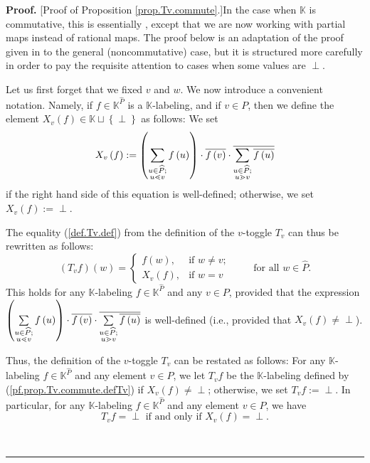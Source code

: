 \documentclass[numbers=enddot,12pt,final,onecolumn,notitlepage]{scrartcl}%
\theoremstyle{definition}
\newenvironment{verlong}{}{}
\newcommand{\undf}{\operatorname*{\bot}}
\newenvironment{proof}[1][Proof]{\noindent\textbf{#1.} }{\ \rule{0.5em}{0.5em}}
\let\sumnonlimits\sum
\renewcommand{\sum}{\sumnonlimits\limits}
\begin{document}
\begin{verlong}


\begin{proof}
[Proof of Proposition \ref{prop.Tv.commute}.]In the case when $\mathbb{K}$ is
commutative, this is essentially \cite[Proposition 2.10]{bir-row-arxiv},
except that we are now working with partial maps instead of rational maps. The
proof below is an adaptation of the proof given in \cite{bir-row-arxiv} to the
general (noncommutative) case, but it is structured more carefully in order to
pay the requisite attention to cases when some values are $\undf$.

Let us first forget that we fixed $v$ and $w$. We now introduce a convenient
notation. Namely, if $f\in\mathbb{K}^{\widehat{P}}$ is a $\mathbb{K}%
$-labeling, and if $v\in P$, then we define the element $X_{v}\left(
f\right)  \in\mathbb{K}\sqcup\left\{  \undf\right\}  $ as follows: We set%
\[
X_{v}\left(  f\right)  :=\left(  \sum\limits_{\substack{u\in\widehat{P}%
;\\u\lessdot v}}f\left(  u\right)  \right)  \cdot\overline{f\left(  v\right)
}\cdot\overline{\sum\limits_{\substack{u\in\widehat{P};\\u\gtrdot v}%
}\overline{f\left(  u\right)  }}%
\]
if the right hand side of this equation is well-defined; otherwise, we set
$X_{v}\left(  f\right)  :=\undf$.

The equality (\ref{def.Tv.def}) from the definition of the $v$-toggle $T_{v}$
can thus be rewritten as follows:%
\begin{equation}
\left(  T_{v}f\right)  \left(  w\right)  =%
\begin{cases}
f\left(  w\right)  , & \text{if }w\neq v;\\
X_{v}\left(  f\right)  , & \text{if }w=v
\end{cases}
\ \ \ \ \ \ \ \ \ \ \text{for all }w\in\widehat{P}.
\label{pf.prop.Tv.commute.defTv}%
\end{equation}
This holds for any $\mathbb{K}$-labeling $f\in\mathbb{K}^{\widehat{P}}$ and
any $v\in P$, provided that the expression $\left(  \sum
\limits_{\substack{u\in\widehat{P};\\u\lessdot v}}f\left(  u\right)  \right)
\cdot\overline{f\left(  v\right)  }\cdot\overline{\sum\limits_{\substack{u\in
\widehat{P};\\u\gtrdot v}}\overline{f\left(  u\right)  }}$ is well-defined
(i.e., provided that $X_{v}\left(  f\right)  \neq\undf$).

Thus, the definition of the $v$-toggle $T_{v}$ can be restated as follows: For
any $\mathbb{K}$-labeling $f\in\mathbb{K}^{\widehat{P}}$ and any element $v\in
P$, we let $T_{v}f$ be the $\mathbb{K}$-labeling defined by
(\ref{pf.prop.Tv.commute.defTv}) if $X_{v}\left(  f\right)  \neq\undf$;
otherwise, we set $T_{v}f:=\undf$. In particular, for any $\mathbb{K}%
$-labeling $f\in\mathbb{K}^{\widehat{P}}$ and any element $v\in P$, we have%
\begin{equation}
T_{v}f=\undf\text{ if and only if }X_{v}\left(  f\right)  =\undf.
\label{pf.prop.Tv.commute.Tvfnone}%
\end{equation}



\end{proof}
\end{verlong}
\end{document}
